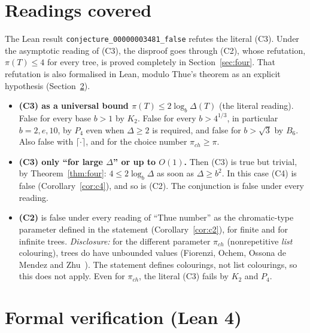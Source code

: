 \documentclass[11pt]{article}
\theoremstyle{definition}
\theoremstyle{remark}
\begin{document}
\section{Readings covered}\label{sec:readings}

The Lean result \texttt{conjecture\_00000003481\_false} refutes the literal (C3). Under the
asymptotic reading of (C3), the disproof goes through (C2), whose refutation, $\pi(T)\le4$ for
every tree, is proved completely in Section~\ref{sec:four}. That refutation is also formalised in Lean,
modulo Thue's theorem as an explicit hypothesis (Section~\ref{sec:lean}).

\begin{itemize}
\item \textbf{(C3) as a universal bound $\pi(T)\le2\log_b\Delta(T)$} (the literal reading).
False for every base $b>1$ by $K_2$. False for every $b>4^{1/3}$, in particular $b=2,e,10$, by
$P_4$ even when $\Delta\ge2$ is required, and false for $b>\sqrt3$ by $B_6$. Also false with
$\lceil\cdot\rceil$, and for the choice number $\pi_{ch}\ge\pi$.
\item \textbf{(C3) only ``for large $\Delta$'' or up to $O(1)$.} Then (C3) is true but trivial,
by Theorem~\ref{thm:four}: $4\le2\log_b\Delta$ as soon as $\Delta\ge b^2$. In this case (C4)
is false (Corollary~\ref{cor:c4}), and so is (C2). The conjunction is false under every reading.
\item \textbf{(C2)} is false under every reading of ``Thue number'' as the chromatic-type
parameter defined in the statement (Corollary~\ref{cor:c2}), for finite and for infinite trees.
\emph{Disclosure:} for the different parameter $\pi_{ch}$ (nonrepetitive \emph{list}
colouring), trees do have unbounded values (Fiorenzi, Ochem, Ossona de Mendez and
Zhu~\cite{FOOZ}). The statement defines colourings, not list colourings, so this does not apply.
Even for $\pi_{ch}$, the literal (C3) fails by $K_2$ and $P_4$.
\end{itemize}

\section{Formal verification (Lean 4)}\label{sec:lean}
\end{document}
